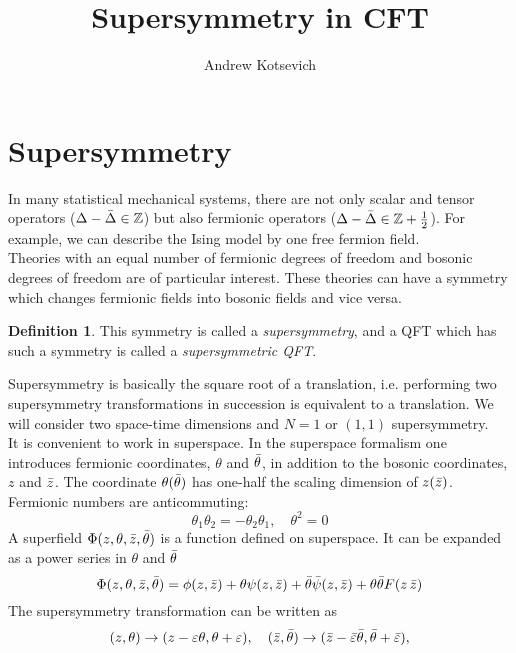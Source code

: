 \documentclass[12pt]{article}
\title{Supersymmetry in CFT}
\author{Andrew Kotsevich}
\date{}
\theoremstyle{definition}
\newtheorem{defin}{Definition}[]
\begin{document}
\maketitle
\newpage
\tableofcontents{}
\newpage
\section{Supersymmetry}
In many statistical mechanical systems, there are not only scalar and tensor operators ($\Delta-\Bar{\Delta}\in\mathbb{Z}$) but also fermionic operators ($\Delta-\Bar{\Delta}\in\mathbb{Z}+\frac{1}{2}$). For example, we can describe the Ising model by one free fermion field.\\
Theories with an equal number of fermionic degrees of freedom and bosonic degrees of freedom are of particular interest. These theories can have a symmetry which changes fermionic fields into bosonic fields and vice versa.
\begin{defin}
    This symmetry is called a \textit{supersymmetry}, and a QFT which has such a symmetry is called a \textit{supersymmetric QFT}.
\end{defin}
Supersymmetry is basically the square root of a translation, i.e. performing two supersymmetry transformations in succession is equivalent to a translation. We will consider two space-time dimensions and $N = 1$ or $(1,1)$ supersymmetry.\\
It is convenient to work in superspace. In the superspace formalism one introduces fermionic coordinates, $\theta$ and $\Bar{\theta}$, in addition to the bosonic coordinates, $z$ and $\Bar{z}$. The coordinate $\theta(\Bar{\theta})$ has one-half the scaling dimension of $z(\Bar{z})$. Fermionic numbers are anticommuting:
\begin{equation}
    \theta_1\theta_2=-\theta_2\theta_1,\quad\theta^2=0
\end{equation}
A superfield $\Phi(z,\theta,\Bar{z},\bar{\theta})$ is a function defined on superspace. It can be expanded as a power series in $\theta$ and $\Bar{\theta}$
\begin{equation}
    \Phi(z,\theta,\Bar{z},\bar{\theta})=\phi(z,\Bar{z})+
    \theta\psi(z,\Bar{z})+\Bar{\theta}\Bar{\psi}(z,\Bar{z})+\theta\Bar{\theta}F(z\,\Bar{z})
\end{equation}
The supersymmetry transformation can be written as 
\begin{equation}
    (z,\theta)\rightarrow(z-\varepsilon\theta,\theta+\varepsilon),\quad(\Bar{z},\Bar{\theta})\rightarrow(\Bar{z}-\bar{\varepsilon}\bar{\theta},\Bar{\theta}+\bar{\varepsilon}),
\end{equation}
\end{document}
